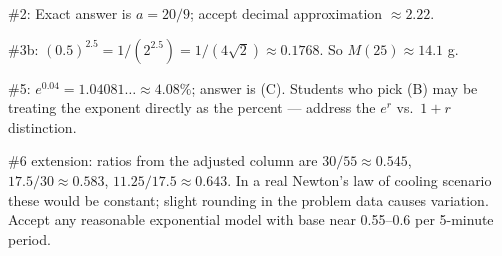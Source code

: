 \documentclass[10pt]{article}
\begin{document}
\begin{teachernote}[Homework]
\#2: Exact answer is $a = 20/9$; accept decimal approximation $\approx 2.22$.

\#3b: $(0.5)^{2.5} = 1/(2^{2.5}) = 1/(4\sqrt{2}) \approx 0.1768$. So $M(25) \approx 14.1$ g.

\#5: $e^{0.04} = 1.04081\ldots \approx 4.08\%$; answer is (C). Students who pick (B) may be treating the exponent directly as the percent --- address the $e^r$ vs.\ $1 + r$ distinction.

\#6 extension: ratios from the adjusted column are $30/55 \approx 0.545$, $17.5/30 \approx 0.583$, $11.25/17.5 \approx 0.643$. In a real Newton's law of cooling scenario these would be constant; slight rounding in the problem data causes variation. Accept any reasonable exponential model with base near 0.55--0.6 per 5-minute period.
\end{teachernote}
\end{document}
